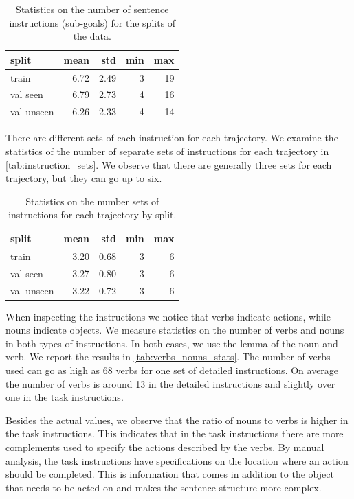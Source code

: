 \documentclass[11pt,a4paper]{article}
\begin{document}
\begin{table}[]
    \centering
\begin{tabular}{lrrrr}
\toprule
     split &  mean &  std &  min &  max \\
\midrule
     train &  6.72 & 2.49 &    3 &   19 \\
  val seen &  6.79 & 2.73 &    4 &   16 \\
val unseen &  6.26 & 2.33 &    4 &   14 \\
\bottomrule
\end{tabular}
    \caption{Statistics on the number of sentence instructions (sub-goals) for the splits of the data.}
    \label{tab:sub_goals}
\end{table}


There are different sets of each instruction for each trajectory. We examine the statistics of the number of separate sets of instructions for each trajectory in \autoref{tab:instruction_sets}. We observe that there are generally three sets for each trajectory, but they can go up to six.

\begin{table}[]
    \centering
    \begin{tabular}{lrrrr}
    \toprule
         split &  mean &  std &  min &  max \\
    \midrule
         train &  3.20 & 0.68 &    3 &    6 \\
      val seen &  3.27 & 0.80 &    3 &    6 \\
    val unseen &  3.22 & 0.72 &    3 &    6 \\
    \bottomrule
    \end{tabular}
    \caption{Statistics on the number sets of instructions for each trajectory by split.}
    \label{tab:instruction_sets}
\end{table}

When inspecting the instructions we notice that verbs indicate actions, while nouns indicate objects. We measure statistics on the number of verbs and nouns in both types of instructions. In both cases, we use the lemma of the noun and verb. We report the results in \autoref{tab:verbs_nouns_stats}. The number of verbs used can go as high as 68 verbs for one set of detailed instructions. On average the number of verbs is around 13 in the detailed instructions and slightly over one in the task instructions. 

Besides the actual values, we observe that the ratio of nouns to verbs is higher in the task instructions. This indicates that in the task instructions there are more complements used to specify the actions described by the verbs. By manual analysis, the task instructions have specifications on the location where an action should be completed. This is information that comes in addition to the object that needs to be acted on and makes the sentence structure more complex. 
\end{document}
